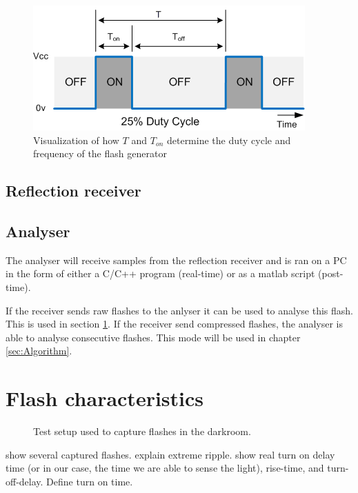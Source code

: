 \begin{figure}[!h]
	\centering
	\includegraphics[]{pics/DutyCycle.png}
	\caption{Visualization of how $T$ and $T_{on}$ determine the duty cycle and frequency of the flash generator}
	\label{fig:DutyCycle}
\end{figure}

\subsection{Reflection receiver}

\subsection{Analyser}
The analyser will receive samples from the reflection receiver and is ran on a PC in the form of either a C/C++ program (real-time) or as a matlab script (post-time).

If the receiver sends raw flashes to the anlyser it can be used to analyse this flash. This is used in section \ref{sec:Flash_characteristics}. If the receiver send compressed flashes, the analyser is able to analyse consecutive flashes. This mode will be used in chapter \ref{sec:Algorithm}.


\section{Flash characteristics}
\label{sec:Flash_characteristics}

\begin{figure}
	\centering     %
	\label{fig:Flashcapturing}
	\caption{Test setup used to capture flashes in the darkroom.}
\end{figure}

show several captured flashes.
explain extreme ripple.
show real turn on delay time (or in our case, the time we are able to sense the light), rise-time, and turn-off-delay.
Define turn on time.

